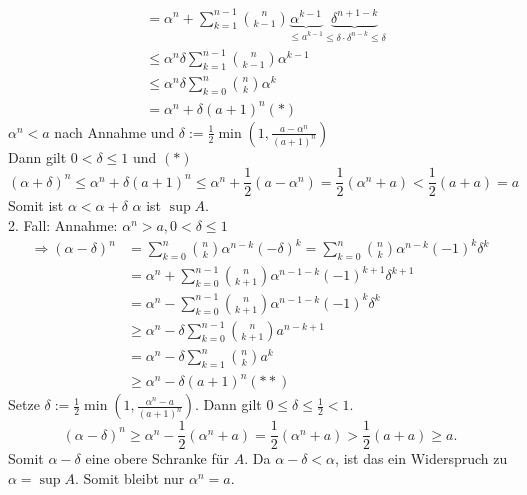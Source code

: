 \documentclass[../ana1.tex]{subfiles}
\begin{document}
\begin{bew}
\begin{align*}
		                    & = \alpha^n + \sum_{k=1}^{n-1} \binom{n}{k-1} \underbrace{\alpha^{k-1}}_{\leq a^{k-1}}\underbrace{\delta^{n+1-k}}_{\leq \delta \cdot \delta^{n-k} \leq \delta} \\
		                    & \leq \alpha^n \delta \sum_{k=1}^{n-1} \binom{n}{k-1} \alpha^{k-1}                                                                                             \\
		                    & \leq \alpha^n \delta \sum_{k=0}^{n} \binom{n}{k} \alpha^{k}                                                                                                   \\
		                    & = \alpha^n + \delta(a+1)^n (*)
	\end{align*}
	$\alpha^n <a$ nach Annahme und $\delta := \frac{1}{2} \min\left(1, \frac{a-\alpha^n}{(a+1)^n}\right)$\\
	Dann gilt $0<\delta\leq 1$ und $(*)$
	$$(\alpha + \delta)^n \leq \alpha^n + \delta(a+1)^n \leq \alpha^n + \frac{1}{2} (a-\alpha^n) = \frac{1}{2} (\alpha^n+a) < \frac{1}{2} (a+a) =a$$
	Somit ist $\alpha < \alpha + \delta$ \Lightning $\alpha$ ist $\sup A$.\\
	2. Fall: Annahme: $\alpha^n > a, 0<\delta \leq 1$
	\begin{align*}
		\Rightarrow (\alpha - \delta)^n & = \sum_{k=0}^{n} \binom{n}{k} \alpha^{n-k} (-\delta)^k = \sum_{k=0}^{n} \binom{n}{k} \alpha^{n-k} (-1)^k\delta^k \\
		                                & = \alpha^n + \sum_{k=0}^{n-1} \binom{n}{k+1} \alpha^{n-1-k} (-1)^{k+1}\delta^{k+1}                               \\
		                                & = \alpha^n - \sum_{k=0}^{n-1} \binom{n}{k+1} \alpha^{n-1-k} (-1)^{k} \delta^k                                    \\
		                                & \geq \alpha^n - \delta \sum_{k=0}^{n-1} \binom{n}{k+1} a^{n-k+1}                                                 \\
		                                & = \alpha^n - \delta \sum_{k=1}^{n} \binom{n}{k} a^k                                                              \\
		                                & \geq \alpha^n - \delta (a+1)^n (**)
	\end{align*}
	Setze $\delta := \frac{1}{2} \min \left(1, \frac{\alpha^n-a}{(a+1)^n} \right)$. Dann gilt $0\leq\delta\leq \frac{1}{2}<1$.
	$$(\alpha -\delta)^n \geq \alpha^n - \frac{1}{2} (\alpha^n + a) = \frac{1}{2} (\alpha^n + a) > \frac{1}{2} (a + a) \geq a.$$
	Somit $\alpha - \delta$ eine obere Schranke für $A$. Da $\alpha - \delta<\alpha$, ist das ein Widerspruch zu $\alpha = \sup A$. Somit bleibt nur $\alpha^n = a$.
\end{bew}
\end{document}

